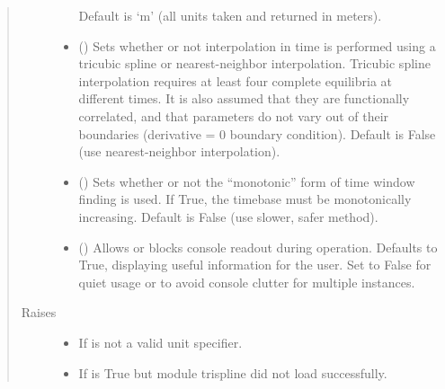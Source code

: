 \documentclass[letterpaper,10pt,english]{sphinxmanual}
\begin{document}
\begin{fulllineitems}
\begin{quote}
\begin{description}
\begin{itemize}
Default is ‘m’ (all units taken and returned in meters).


\item {} 
 () \textendash{} Sets whether or not interpolation in time is
performed using a tricubic spline or nearest-neighbor interpolation.
Tricubic spline interpolation requires at least four complete
equilibria at different times. It is also assumed that they are
functionally correlated, and that parameters do not vary out of
their boundaries (derivative = 0 boundary condition). Default is
False (use nearest-neighbor interpolation).

\item {} 
 () \textendash{} Sets whether or not the “monotonic” form of time
window finding is used. If True, the timebase must be monotonically
increasing. Default is False (use slower, safer method).

\item {} 
 () \textendash{} Allows or blocks console readout during operation.
Defaults to True, displaying useful information for the user. Set to
False for quiet usage or to avoid console clutter for multiple
instances.

\end{itemize}

\item[{Raises}] \leavevmode\begin{itemize}
\item {} 
 \textendash{} If  is not a valid unit specifier.

\item {} 
 \textendash{} If  is True but module trispline did not load
    successfully.

\end{itemize}

\end{description}\end{quote}


\end{fulllineitems}
\end{document}
